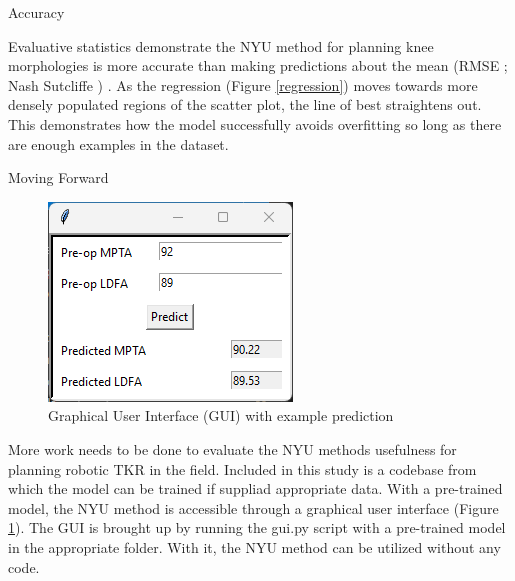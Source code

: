 \documentclass{article}
\begin{document}
Accuracy

	Evaluative statistics demonstrate the NYU method for planning knee morphologies is more accurate than making predictions about the mean
(RMSE \mse; Nash Sutcliffe \ns) \cite{goodness-of-fit}. 
As the regression (Figure \ref{regression}) moves towards more densely populated regions of the scatter plot, the line of best straightens out.
This demonstrates how the model successfully avoids overfitting so long as there are enough examples in the dataset.

Moving Forward

\begin{figure}
	\centering
	\includegraphics[width=.5\linewidth]{gui.png}
	\caption{Graphical User Interface (GUI) with example prediction}
	\label{gui}
\end{figure}

	More work needs to be done to evaluate the NYU methods usefulness for planning robotic TKR in the field.
Included in this study is a codebase from which the model can be trained if suppliad appropriate data. With a pre-trained model,
the NYU method is accessible through a graphical user interface (Figure \ref{gui}).
The GUI is brought up by running the gui.py script with a pre-trained model in the appropriate folder.
With it, the NYU method can be utilized without any code.

\medskip

\printbibliography
\end{document}
